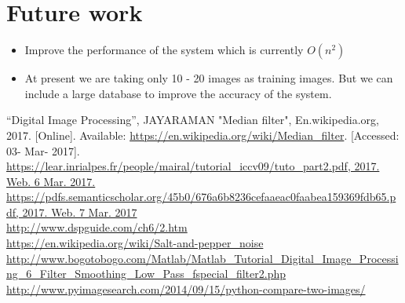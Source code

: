 \documentclass[journal]{IEEEtran}
\begin{document}
	\section{\textbf{Future work}}
	\begin{itemize}
	    \item Improve the performance of the system which is currently $O(n^2)$
	    \item At present we are taking only 10 - 20 images as training images. But we can include a large database to improve the accuracy of the system.
	\end{itemize}

	\begin{thebibliography}{1}
	“Digital Image Processing”, JAYARAMAN
	"Median filter", En.wikipedia.org, 2017. [Online]. Available:
	\url{https://en.wikipedia.org/wiki/Median_filter}. [Accessed: 03- Mar- 2017].\\
	\url{https://lear.inrialpes.fr/people/mairal/tutorial_iccv09/tuto_part2.pdf, 2017. Web. 6 Mar. 2017.}\\
	\url{https://pdfs.semanticscholar.org/45b0/676a6b8236cefaaeac0faabea159369fdb65.pdf, 2017. Web. 7 Mar. 2017}\\
	\url{ http://www.dspguide.com/ch6/2.htm}\\
	\url{ https://en.wikipedia.org/wiki/Salt-and-pepper_noise}
	\url{ http://www.bogotobogo.com/Matlab/Matlab_Tutorial_Digital_Image_Processing_6_Filter_Smoothing_Low_Pass_fspecial_filter2.php}
	\url{ http://www.pyimagesearch.com/2014/09/15/python-compare-two-images/}
	
	\end{thebibliography}
	
	
	\ifCLASSOPTIONcaptionsoff
	\newpage
	\fi
	
\end{document}
